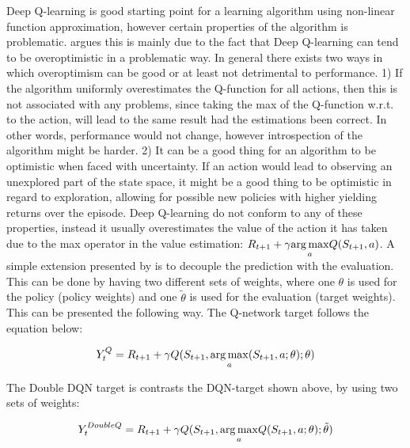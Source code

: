 Deep Q-learning is good starting point for a learning algorithm using non-linear function approximation, however certain properties of the algorithm is problematic. \textcite{van_hasselt_deep_2015} argues this is mainly due to the fact that Deep Q-learning can tend to be overoptimistic in a problematic way. In general there exists two ways in which overoptimism can be good or at least not detrimental to performance. 1) If the algorithm uniformly overestimates the Q-function for all actions, then this is not associated with any problems, since taking the max of the Q-function w.r.t. to the action, will lead to the same result had the estimations been correct. In other words, performance would not change, however introspection of the algorithm might be harder. 2) It can be a good thing for an algorithm to be optimistic when faced with uncertainty. If an action would lead to observing an unexplored part of the state space, it might be a good thing to be optimistic in regard to exploration, allowing for possible new policies with higher yielding returns over the episode. Deep Q-learning do not conform to any of these properties, instead it usually overestimates the value of the action it has taken due to the max operator in the value estimation: $R_{t+1} + \gamma \underset{a}{\operatorname*{arg\,max}} Q(S_{t+1},a)$. A simple extension presented by \textcite{van_hasselt_deep_2015} is to decouple the prediction with the evaluation. This can be done by having two different sets of weights, where one $\theta$ is used for the policy (policy weights) and one $\tilde{\theta}$ is used for the evaluation (target weights). This can be presented the following way. The Q-network target follows the equation below:

\begin{equation}\label{eq:dqn_target}
    Y_t^{Q} = R_{t+1} + \gamma Q(S_{t+1}, \underset{a}{\operatorname*{arg\,max}} (S_{t+1}, a ; \theta) ; \theta)
\end{equation}

The Double DQN target is contrasts the DQN-target shown above, by using two sets of weights:

\begin{equation}\label{eq:ddqn_target}
    Y_t^{DoubleQ} = R_{t+1} + \gamma Q(S_{t+1}, \underset{a}{\operatorname*{arg\,max}}Q(S_{t+1}, a; \theta); \tilde{\theta}) 
\end{equation}

